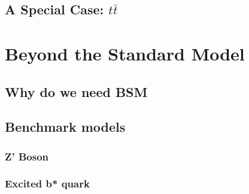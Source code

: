 
\subsection{A Special Case: $t\bar{t}$}



\section{Beyond the Standard Model}
\label{theo-bsm}

\subsection{Why do we need BSM}
\subsection{Benchmark models}
\subsubsection{Z' Boson}
\subsubsection{Excited b* quark}
